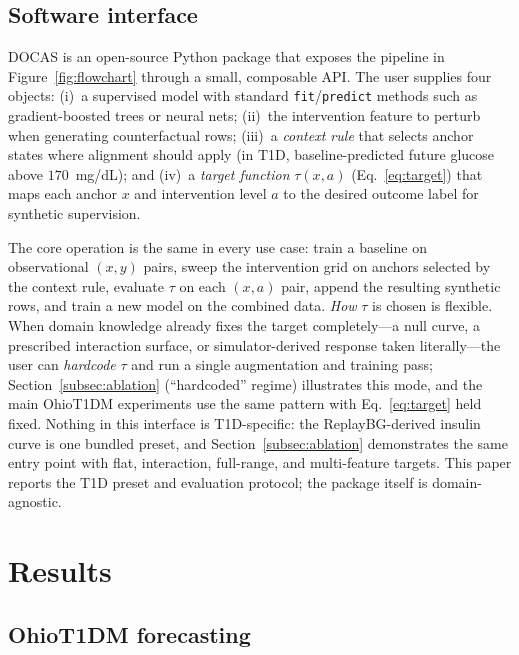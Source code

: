 \documentclass[a4paper,fleqn]{cas-sc}
\begin{document}
\subsection{Software interface}\label{subsec:software}
DOCAS is an open-source Python package that exposes the pipeline in
Figure~\ref{fig:flowchart} through a small, composable API. The user supplies
four objects: (i)~a supervised model with standard \texttt{fit}/\texttt{predict}
methods such as gradient-boosted trees or neural nets; (ii)~the intervention feature to perturb when generating
counterfactual rows; (iii)~a \emph{context rule} that selects anchor states
where alignment should apply (in T1D, baseline-predicted future glucose above
$170$~mg/dL); and (iv)~a \emph{target function} $\tau(x,a)$ (Eq.~\ref{eq:target})
that maps each anchor $x$ and intervention level $a$ to the desired outcome
label for synthetic supervision.

The core operation is the same in every use case: train a baseline on
observational $(x,y)$ pairs, sweep the intervention grid on anchors selected
by the context rule, evaluate $\tau$ on each $(x,a)$ pair, append the
resulting synthetic rows, and train a new model on the combined data. \emph{How} $\tau$ is chosen
is flexible. When domain knowledge already fixes the target completely---a
null curve, a prescribed interaction surface, or simulator-derived response
taken literally---the user can \emph{hardcode} $\tau$ and run a single
augmentation and training pass; Section~\ref{subsec:ablation}
(``hardcoded'' regime) illustrates this mode, and the main OhioT1DM
experiments use the same pattern with Eq.~\ref{eq:target} held fixed.
Nothing in this interface is
T1D-specific: the ReplayBG-derived insulin curve is one bundled preset, and
Section~\ref{subsec:ablation} demonstrates the same entry point with flat,
interaction, full-range, and multi-feature targets. This paper reports the T1D preset and
evaluation protocol; the package itself is domain-agnostic.

\section{Results}\label{sec:results}

\subsection{OhioT1DM forecasting}\label{subsec:ohio-results}
\end{document}
